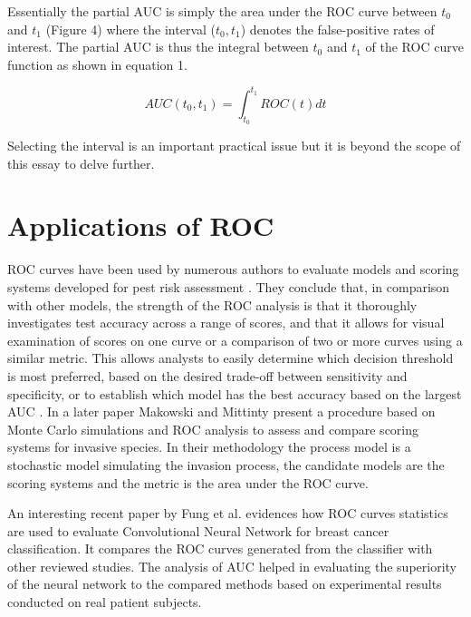 Essentially the partial AUC is simply the area under the ROC curve between $t_{0}$ and $t_{1}$ (Figure 4) where the interval ($t_{0},t_{1}$) denotes the false-positive rates of interest. The partial AUC is thus the integral between $t_{0}$ and $t_{1}$ of the ROC curve function as shown in equation 1.

\begin{equation}\label{eq:partial-auc}
AUC(t_{0},t_{1}) = \int_{t_{0}}^{t_{1}} ROC(t)  dt
\end{equation}

Selecting the interval is an important practical issue but it is beyond the scope of this essay to delve further.

\section{Applications of ROC}
ROC curves have been used by numerous authors to evaluate models and scoring systems developed for pest risk assessment \citep{copp2009screening,heidy2010minfneginvspec}. They conclude that, in comparison with other models, the strength of the ROC analysis is that it thoroughly investigates test accuracy across a range of scores, and that it allows for visual examination of scores on one curve or a comparison of two or more curves using a similar metric. This allows analysts to easily determine which decision threshold is most preferred, based on the desired trade-off between sensitivity and specificity, or to establish which model has the best accuracy based on the largest AUC \citep{linden2006diagpreddismgmt}. In a later paper Makowski and Mittinty \citep{makowski2010scorsysinvpests} present a procedure based on Monte Carlo simulations and ROC analysis to assess and compare scoring systems for invasive species. In their methodology the process model is a stochastic model simulating the invasion process, the candidate models are the scoring systems and the metric is the area under the ROC curve.

An interesting recent paper by Fung et al. \citep{fung2018cnnbcancerclass} evidences how ROC curves statistics are used to evaluate Convolutional Neural Network for breast cancer classification. It compares the ROC curves generated from the classifier with other reviewed studies. The analysis of AUC helped in evaluating the superiority of the neural network to the compared methods based on experimental results conducted on real patient subjects.

